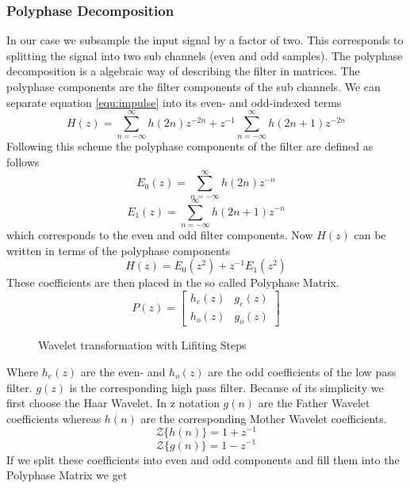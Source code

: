 \begin{refsection}
\subsubsection{Polyphase Decomposition \label{fpga:polyphase}}

In our case we subsample the input signal by a factor of two.
This corresponds to splitting the signal into two sub channels (even and odd samples).
The polyphase decomposition is a algebraic way of describing the filter in matrices.
The polyphase components are the filter components of the sub channels. 
We can separate equation \ref{equ:impulse} into its even- and odd-indexed terms
\begin{equation}
	H(z) = \sum_{n=-\infty}^{\infty} h(2n)z^{-2n} + z^{-1} \sum_{n=-\infty}^{\infty} h(2n+1)z^{-2n}
\end{equation}
Following this scheme the polyphase components of the filter are defined as follows
\begin{equation}
E_0(z) = \sum_{n=-\infty}^{\infty} h(2n)z^{-n}
\end{equation}
\begin{equation}
E_1(z) = \sum_{n=-\infty}^{\infty} h(2n+1)z^{-n}
\end{equation}
which corresponds to the even and odd filter components.
Now $H(z)$ can be written in terms of the polyphase components
\begin{equation}
H(z)=E_{0}(z^2)+z^{-1} E_1(z^2)
\end{equation}
These coefficients are then placed in the so called Polyphase Matrix.
\begin{equation}
	P(z) = 
	\begin{bmatrix}
	h_e(z) & g_e(z) \\
	h_o(z) & g_o(z)
	\end{bmatrix}
\end{equation}

\begin{figure}
	\centering
	
	\caption{Wavelet transformation with Lifiting Steps \label{fpga:lstp_wavelet}}
\end{figure}
Where $h_e(z)$ are the even- and $h_o(z)$ are the odd coefficients of the low pass filter.
$g(z)$ is the corresponding high pass filter. 
Because of its simplicity we first choose the Haar Wavelet.
In z notation $g(n)$ are the Father Wavelet coefficients whereas $h(n)$ are the corresponding Mother Wavelet coefficients. 
\begin{equation}
{\mathcal {Z}} \{h(n)\} = 1 + z^{-1}
\end{equation}
\begin{equation}
{\mathcal {Z}} \{g(n)\} = 1 - z^{-1}
\end{equation}
If we split these coefficients into even and odd components and fill them into the Polyphase Matrix we get 


\end{refsection}

